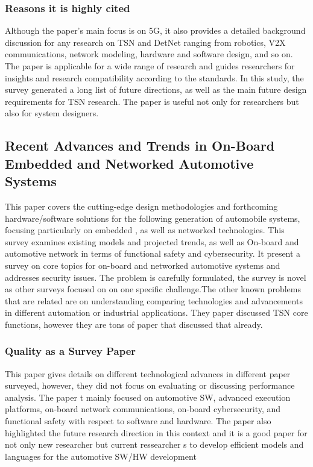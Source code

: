 \documentclass{article}
\begin{document}
\subsubsection{Reasons it is highly cited}
Although the paper's main focus is on 5G, it also provides a detailed background discussion for any research on TSN and DetNet ranging from robotics, V2X communications, network modeling, hardware and software design, and so on. The paper is applicable for a wide range of research and guides researchers for insights and research compatibility according to the standards.
In this study, the survey generated a long list of future directions, as well as the main future design requirements for TSN research. The paper is useful not only for researchers but also for system designers.  

\subsection{Recent Advances and Trends in On-Board
Embedded and Networked Automotive Systems }
This paper  \cite{bello2018recent}covers the cutting-edge design methodologies and forthcoming hardware/software solutions for the following generation of automobile systems, focusing particularly on embedded
, as well as networked technologies. This survey examines existing models and projected trends, as well as
On-board and automotive network in terms of functional safety and cybersecurity. It present a survey on core topics for on-board and
networked automotive systems and addresses security issues.
The problem is carefully formulated, the survey is novel as other surveys focused on on one specific challenge.The other known problems that are related are on understanding comparing technologies and advancements in different automation or industrial  applications. They paper discussed TSN core functions, however they are tons of paper that discussed that already.
\subsubsection{Quality as a Survey Paper}
 This paper gives details on different technological advances in different paper surveyed, however, they did not focus on evaluating or discussing  performance analysis. The paper t mainly focused on
automotive SW, advanced execution platforms, on-board network communications, on-board cybersecurity, and functional
safety with respect to software and hardware.
The paper also highlighted the future research direction in this context and it is a good paper for not only new researcher but current ressearcher s to develop efficient models and languages for the automotive SW/HW development
\end{document}
